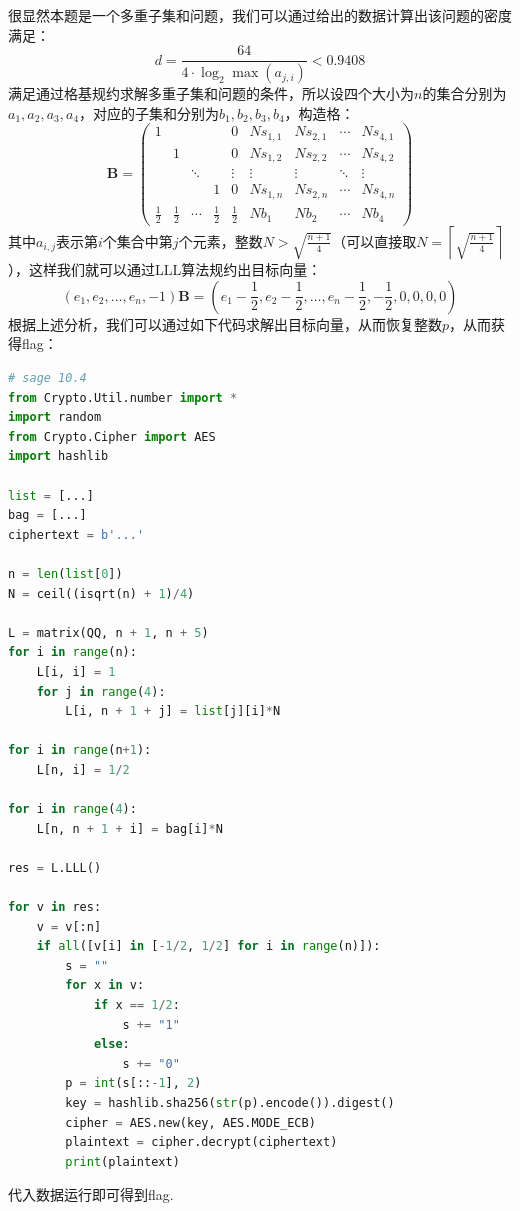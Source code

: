 \documentclass{book}
\numberwithin{equation}{subsubsection}
\begin{document}
很显然本题是一个多重子集和问题，我们可以通过给出的数据计算出该问题的密度满足：
\begin{equation}
    d=\frac{64}{4\cdot\log_{2}\max{(a_{j,i})}}<0.9408
    \nonumber
\end{equation}
满足通过格基规约求解多重子集和问题的条件，所以设四个大小为$n$的集合分别为$a_1,a_2,a_3,a_4$，对应的子集和分别为$b_1,b_2,b_3,b_4$，构造格：
\begin{equation}
    \pmb{B}=\left(\begin{matrix}
        1&&&&0&Ns_{1,1}&Ns_{2,1}&\cdots&Ns_{4,1}\\
        &1&&&0&Ns_{1,2}&Ns_{2,2}&\cdots&Ns_{4,2}\\
        &&\ddots&&\vdots&\vdots&\vdots&\ddots&\vdots\\
        &&&1&0&Ns_{1,n}&Ns_{2,n}&\cdots&Ns_{4,n}\\
        \frac{1}{2}&\frac{1}{2}&\cdots&\frac{1}{2}&\frac{1}{2}&Nb_1&Nb_2&\cdots&Nb_4
    \end{matrix}\right)
    \nonumber
\end{equation}
其中$a_{i,j}$表示第$i$个集合中第$j$个元素，整数$N>\sqrt{\frac{n+1}{4}}$（可以直接取$N=\left\lceil\sqrt{\frac{n+1}{4}}\right\rceil$），这样我们就可以通过LLL算法规约出目标向量：
\begin{equation}
    (e_1,e_2,\ldots,e_n,-1)\pmb{B}=(e_1-\frac{1}{2},e_2-\frac{1}{2},\ldots,e_n-\frac{1}{2},-\frac{1}{2},0,0,0,0)
    \nonumber
\end{equation}
根据上述分析，我们可以通过如下代码求解出目标向量，从而恢复整数$p$，从而获得flag：
\begin{lstlisting}[language=Python,basicstyle=\ttfamily,breaklines=true,keywordstyle=\bfseries\color{blue}]
# sage 10.4
from Crypto.Util.number import *
import random
from Crypto.Cipher import AES
import hashlib

list = [...]
bag = [...]
ciphertext = b'...'

n = len(list[0])
N = ceil((isqrt(n) + 1)/4)

L = matrix(QQ, n + 1, n + 5)
for i in range(n):
    L[i, i] = 1
    for j in range(4):
        L[i, n + 1 + j] = list[j][i]*N

for i in range(n+1):
    L[n, i] = 1/2

for i in range(4):
    L[n, n + 1 + i] = bag[i]*N

res = L.LLL()

for v in res:
    v = v[:n]
    if all([v[i] in [-1/2, 1/2] for i in range(n)]):
        s = ""
        for x in v:
            if x == 1/2:
                s += "1"
            else:
                s += "0"
        p = int(s[::-1], 2)
        key = hashlib.sha256(str(p).encode()).digest()
        cipher = AES.new(key, AES.MODE_ECB)
        plaintext = cipher.decrypt(ciphertext)
        print(plaintext)
\end{lstlisting}
代入数据运行即可得到flag.\par
\end{document}
